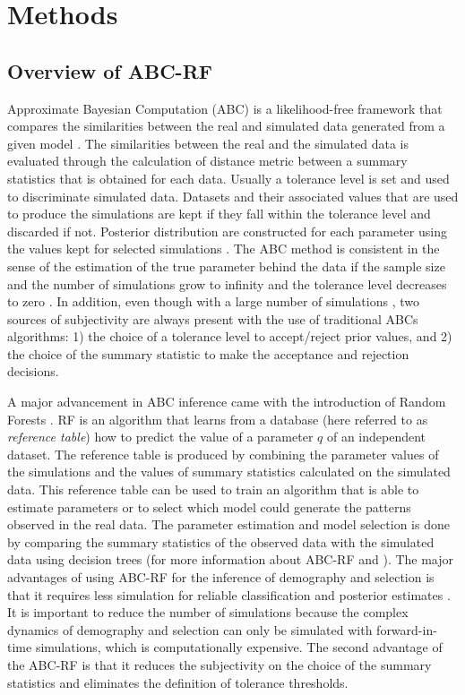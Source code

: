\documentclass[12pt]{article}
\begin{document}
\section*{Methods}

\subsection*{Overview of ABC-RF}

Approximate Bayesian Computation (ABC) is a likelihood-free framework that compares the similarities between the real and simulated data generated from a given model \citep{Beaumont:2002ue}. The similarities between the real and the simulated data is evaluated through the calculation of distance metric between a summary statistics that is obtained for each data. Usually a tolerance level is set and used to discriminate simulated data. Datasets and their associated values that are used to produce the simulations are kept if they fall within the tolerance level and discarded if not. Posterior distribution are constructed for each parameter using the values kept for selected simulations \citep{Beaumont:2010gg}. The ABC method is consistent in the sense of the estimation of the true parameter behind the data if the sample size and the number of simulations grow to infinity and the tolerance level decreases to zero  \citep{Frazier:2018kq}. In addition, even though with a large number of simulations , two sources of subjectivity are always present with the use of traditional ABCs algorithms: 1) the choice of a tolerance level to accept/reject prior values, and 2) the choice of the summary statistic to make the acceptance and rejection decisions. 

A major advancement in ABC inference came with the introduction of Random Forests \citep{Pudlo:2016il,Raynal:2017wm}. RF is an algorithm that learns from a database (here referred to as \textit{reference table}) how to predict the value of a parameter $q$ of an independent dataset. The reference table is produced by combining the parameter values of the simulations and the values of summary statistics calculated on the simulated data. This reference table can be used to train an algorithm that is able to estimate parameters or to select which model could generate the patterns observed in the real data. The parameter estimation and model selection is done by comparing the summary statistics of the observed data with the simulated data using decision trees (for more information about ABC-RF \citet{Pudlo:2016il} and \citet{Raynal:2017wm}). The major advantages of using ABC-RF for the inference of demography and selection is that it requires less simulation for reliable classification \citep{Pudlo:2016il, Fraimout:2017jq} and posterior estimates \citep{Raynal:2017wm}. It is important to reduce the number of simulations because the complex dynamics of demography and selection can only be simulated with forward-in-time simulations, which is computationally expensive. The second advantage of the ABC-RF is that it reduces the subjectivity on the choice of the summary statistics and eliminates the definition of tolerance thresholds. 
\end{document}
